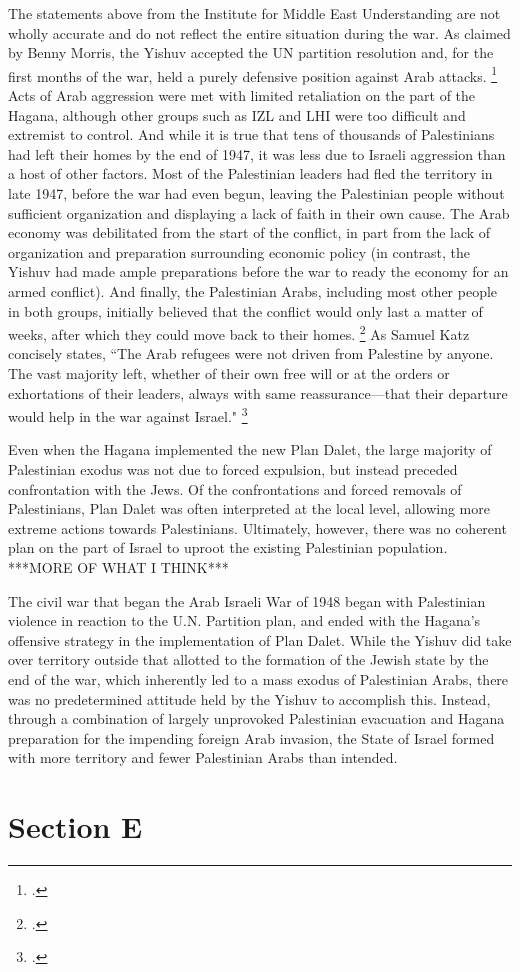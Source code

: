 \documentclass{turabian-researchpaper}
\begin{document}
The statements above from the Institute for Middle East Understanding are not wholly accurate and do not reflect the entire situation during the war.  As claimed by Benny Morris, the Yishuv accepted the UN partition resolution and, for the first months of the war, held a purely defensive position against Arab attacks.
\footcite[][98-100]{morris}
Acts of Arab aggression were met with limited retaliation on the part of the Hagana, although other groups such as IZL and LHI were too difficult and extremist to control.
And while it is true that tens of thousands of Palestinians had left their homes by the end of 1947, it was less due to Israeli aggression than a host of other factors.  Most of the Palestinian leaders had fled the territory in late 1947, before the war had even begun, leaving the Palestinian people without sufficient organization and displaying a lack of faith in their own cause.  The Arab economy was debilitated from the start of the conflict, in part from the lack of organization and preparation surrounding economic policy (in contrast, the Yishuv had made ample preparations before the war to ready the economy for an armed conflict). And finally, the Palestinian Arabs, including most other people in both groups, initially believed that the conflict would only last a matter of weeks, after which they could move back to their homes.
\footcite[][84-85]{pappe}
As Samuel Katz concisely states, ``The Arab refugees were not driven from Palestine by anyone. The vast majority left, whether of their own free will or at the orders or exhortations of their leaders, always with same reassurance—that their departure would help in the war against Israel."
\footcite[][64]{dajani}

Even when the Hagana implemented the new Plan Dalet, the large majority of Palestinian exodus was not due to forced expulsion, but instead preceded confrontation with the Jews.  Of the confrontations and forced removals of Palestinians, Plan Dalet was often interpreted at the local level, allowing more extreme actions towards Palestinians.
Ultimately, however, there was no coherent plan on the part of Israel to uproot the existing Palestinian population. ***MORE OF WHAT I THINK***

The civil war that began the Arab Israeli War of 1948 began with Palestinian violence in reaction to the U.N. Partition plan, and ended with the Hagana's offensive strategy in the implementation of Plan Dalet.  While the Yishuv did take over territory outside that allotted to the formation of the Jewish state by the end of the war, which inherently led to a mass exodus of Palestinian Arabs, there was no predetermined attitude held by the Yishuv to accomplish this.  Instead, through a combination of largely unprovoked Palestinian evacuation and Hagana preparation for the impending foreign Arab invasion, the State of Israel formed with more territory and fewer Palestinian Arabs than intended.

\section{Section E}


\printbibliography{}
\end{document}

